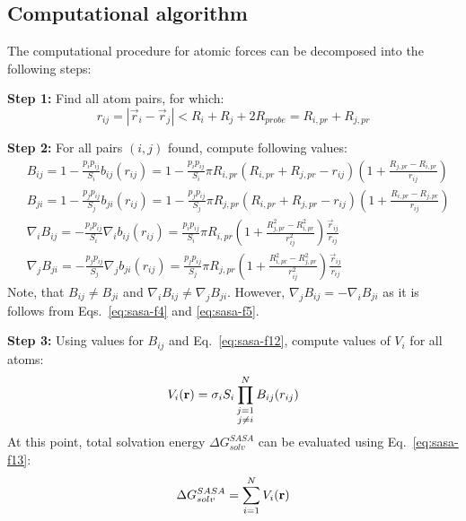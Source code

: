 \documentclass[11pt]{book}
\begin{document}

\subsection{Computational algorithm}
The computational procedure for atomic forces can be decomposed into the following steps:

{\bf Step 1:} Find all atom pairs, for which:
\begin{equation}\label{eq:sasa-comp1}
r_{ij}=\left|\vec{r}_{i}-\vec{r}_{j}\right|<R_{i}+R_{j}+2R_{probe}=R_{i,pr}+R_{j,pr}
\end{equation}

{\bf Step 2:} For all pairs $(i,j)$ found, compute following values:
\begin{equation}\label{eq:sasa-comp2}
\begin{split}
&B_{ij}=1-\frac{p_{i}p_{ij}}{S_{i}}b_{ij}(r_{ij})=1-\frac{p_{i}p_{ij}}{S_{i}}\pi R_{i,pr}\left(R_{i,pr}+R_{j,pr}-r_{ij}\right)\left(1+\frac{R_{j,pr}-R_{i,pr}}{r_{ij}}\right)\\
&B_{ji}=1-\frac{p_{j}p_{ij}}{S_{j}}b_{ji}(r_{ij})=1-\frac{p_{j}p_{ij}}{S_{j}}\pi R_{j,pr}\left(R_{i,pr}+R_{j,pr}-r_{ij}\right)\left(1+\frac{R_{i,pr}-R_{j,pr}}{r_{ij}}\right)\\
&\nabla_{i}B_{ij}=-\frac{p_{i}p_{ij}}{S_{i}}\nabla_{i}b_{ij}(r_{ij})=\frac{p_{i}p_{ij}}{S_{i}}\pi R_{i,pr}\left(1+\frac{R_{j,pr}^{2}-R_{i,pr}^{2}}{r_{ij}^{2}}\right)\frac{\vec{r}_{ij}}{r_{ij}}\\
&\nabla_{j}B_{ji}=-\frac{p_{j}p_{ij}}{S_{j}}\nabla_{j}b_{ji}(r_{ij})=\frac{p_{j}p_{ij}}{S_{j}}\pi R_{j,pr}\left(1+\frac{R_{i,pr}^{2}-R_{j,pr}^{2}}{r_{ij}^{2}}\right)\frac{\vec{r}_{ij}}{r_{ij}}
\end{split}
\end{equation}
Note, that $B_{ij}\ne B_{ji}$ and $\nabla_{i}B_{ij}\ne\nabla_{j}B_{ji}$. However, $\nabla_{j}B_{ij}=-\nabla_{i}B_{ji}$ as it is follows from Eqs.~\ref{eq:sasa-f4} and \ref{eq:sasa-f5}.

{\bf Step 3:} Using values for $B_{ij}$ and Eq.~\ref{eq:sasa-f12}, compute values of $V_{i}$ for all atoms:
\begin{equation}\label{eq:sasa-comp3}
V_{i}({\bf r})=\sigma_{i}S_{i}\prod_{\substack{j=1\\j\ne i}}^{N}B_{ij}(r_{ij})
\end{equation}
At this point, total solvation energy $\Delta G_{solv}^{SASA}$ can be evaluated using Eq.~\ref{eq:sasa-f13}:
\begin{equation}\label{eq:sasa-comp4}
\Delta G_{solv}^{SASA}=\sum_{i=1}^{N}V_{i}({\bf r})
\end{equation}
\end{document}
